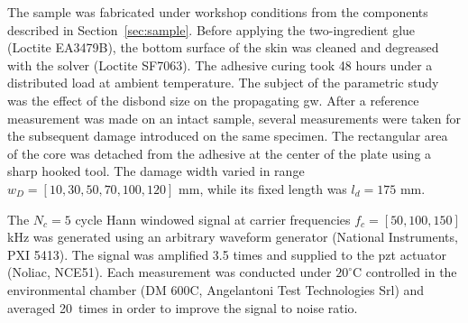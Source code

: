 The sample was fabricated under workshop conditions from the components described in Section~\ref{sec:sample}.
Before applying the two-ingredient glue (Loctite EA3479B), the bottom surface of the skin was cleaned and degreased with the solver (Loctite SF7063).
The adhesive curing took 48 hours under a distributed load at ambient temperature.
The subject of the parametric study was the effect of the disbond size on the propagating \ac{gw}.
After a reference measurement was made on an intact sample, several measurements were taken for the subsequent damage introduced on the same specimen.
The rectangular area of the core was detached from the adhesive at the center of the plate using a sharp hooked tool.
The damage width varied in range \(w_D=\left [10, 30, 50, 70, 100, 120 \right ]\) mm, while its fixed length was \(l_d = 175\) mm.

The \(N_c=5\) cycle Hann windowed signal at carrier frequencies \(f_c=[50,100,150]\) kHz was generated using an arbitrary waveform generator (National Instruments, PXI 5413).
The signal was amplified 3.5 times and supplied to the \ac{pzt} actuator (Noliac, NCE51).
Each measurement was conducted under \(20^{\circ}\)C controlled in the environmental chamber (DM 600C, Angelantoni Test Technologies Srl) and averaged 20~times in order to improve the signal to noise ratio.